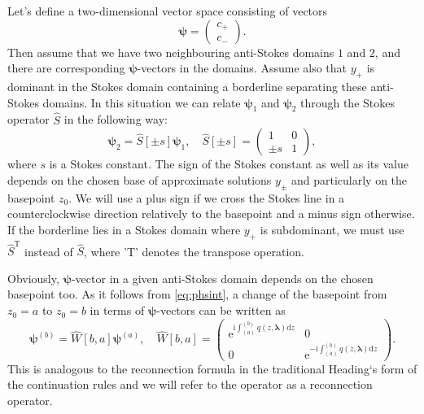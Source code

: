 \documentclass[atmp]{ipart_v1}
\def\rmd{\mathrm{d}}
\def\rme{\mathrm{e}}
\def\rmi{\mathrm{i}}
\def\S{\widehat{S}}
\def\W{\widehat{W}}
\def\psii{\bm\psi}
\def\lmbd{\bm{\lambda}}
\def\Tp{\mathrm{T}}
\newcommand\eref[1]{\eqref{#1}}
\newcommand\phsintgrnd[1][z]{q(#1,\lmbd)}
\newcommand\phsintgrl[3][z]{\int_{#2}^{#3} \phsintgrnd[#1] \rmd #1}
\begin{document}
Let's define a two-dimensional vector space consisting of vectors
\begin{equation}
\psii= \left(\begin{array}{*{2}{c}} c_+ \\ c_- \end{array}\right).
\end{equation}
Then assume that we have two neighbouring anti-Stokes domains $1$ and $2$, and there are 
corresponding $\psii$-vectors in the domains. Assume also that $y_+$ is dominant in the Stokes 
domain containing a borderline separating these anti-Stokes domains. 
In this situation we can relate $\psii_1$ and $\psii_2$ through the Stokes 
operator $\S$ in the following way:
\begin{equation}
\psii_2 = \S[\pm s] \psii_1, \quad 
\S[\pm s] = \left(\begin{array}{*{2}{c}} 1 & 0 \\ \pm s & 1 \end{array}\right),    
\end{equation}
where $s$ is a Stokes constant. The sign of the Stokes constant as well as its value 
depends on the chosen base of approximate solutions $y_\pm$ and particularly on the 
basepoint $z_0$. We will use a plus sign if we cross the Stokes line in a counterclockwise 
direction relatively to the basepoint and a minus sign otherwise. If the borderline lies in 
a Stokes domain where $y_+$ is subdominant, we must use $\S^{\Tp}$ instead of $\S$, where 'T' 
denotes the transpose operation.

Obviously, $\psii$-vector in a given anti-Stokes domain depends on the chosen basepoint too. 
As it follows from \eref{eq:phsint}, a change of the basepoint from $z_0=a$ to $z_0=b$ in 
terms of $\psii$-vectors can be written as
\begin{equation}
\psii^{(b)} = \W[b,a] \psii^{(a)}, \quad 
\W[b,a] =  
\left(\begin{array}{*{2}{c}}
\rme^{\rmi \phsintgrl{(a)}{(b)}} & 0 \\ 0 & \rme^{-\rmi \phsintgrl{(a)}{(b)}} 
\end{array}\right).
\end{equation}
This is analogous to the reconnection formula in the traditional Heading`s form of the continuation 
rules and we will refer to the operator as a reconnection operator.
\end{document}
